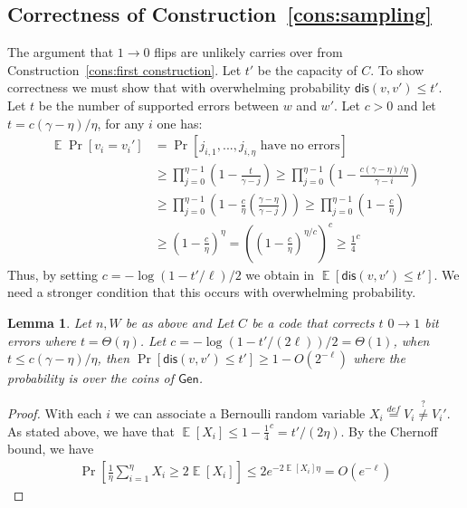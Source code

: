 \documentclass[11pt]{article}
\newcommand{\consref}[1]{\mbox{Construction~\ref{#1}}}
\DeclareMathOperator*{\expe}{\mathbb{E}}
\newcommand{\class}[1]{{\ensuremath{\mathsf{#1}}}}
\newcommand{\gen}{\ensuremath{\class{Gen}}\xspace}
\newcommand{\dis}{\ensuremath{\mathsf{dis}}}
\newtheorem{lemma}[theorem]{Lemma}
\begin{document}
\subsection{Correctness of \consref{cons:sampling}}
The argument that $1\rightarrow 0$ flips are unlikely carries over from \consref{cons:first construction}.  Let $t'$ be the capacity of $C$.  To show correctness we must show that with overwhelming probability $\dis(v, v')\leq t'$.  Let $t$ be the number of supported errors between $w$ and $w'$.  Let $c>0$ and let $t = c(\gamma-\eta)/\eta$, for any  $i$ one has:
\begin{align*}
\expe \Pr[v_i = v_i'] &=\Pr[j_{i,1},..., j_{i,\eta}\text{ have no errors}]\\
&\geq \prod_{j=0}^{\eta-1}\left(1 - \frac{t}{\gamma-j}\right)\geq \prod_{j=0}^{\eta-1}\left( 1-\frac{c(\gamma-\eta)/\eta}{\gamma-i}\right)\\
&\geq  \prod_{j=0}^{\eta-1}\left( 1-\frac{c}{\eta}\left(\frac{\gamma-\eta}{\gamma-j}\right)\right)\geq \prod_{j=0}^{\eta-1}\left( 1-\frac{c}{\eta}\right) \\
&\geq \left(1-\frac{c}{\eta}\right)^{\eta} =\left( \left(1-\frac{c}{\eta}\right)^{\eta/c}\right)^c\geq \frac{1}{4}^c
\end{align*} 
Thus, by setting $c = -\log(1-t'/\ell)/2$ we obtain in $\expe[\dis(v, v')\leq t']$.  We need a stronger condition that this occurs with overwhelming probability.

\begin{lemma}
Let $n, W$ be as above and Let $C$ be a code that corrects $t$ $0\rightarrow 1$ bit errors where $t =\Theta(\eta)$.  Let $c = -\log(1-t'/(2\ell))/2 = \Theta(1)$, when $t \leq c(\gamma - \eta)/\eta$, then $\Pr[\dis(v, v')\leq t']\geq 1-O(2^{-\ell})$ where the probability is over the coins of $\gen$.
\end{lemma}
\begin{proof}
With each $i$ we can associate a Bernoulli random variable $X_i \overset{def}= V_i \overset{?}\neq V_i'$.  As stated above, we have that $\expe[X_i] \leq 1-\frac{1}{4}^c = t'/(2\eta)$. By the Chernoff bound, we have
\begin{align*}
\Pr\left[\frac{1}{\eta} \sum_{i=1}^\eta X_i\geq 2\expe[X_i]\right]\leq 2e^{-2\expe[X_i]\eta} = O(e^{- \ell}) 
\end{align*}
\end{proof}
\end{document}
